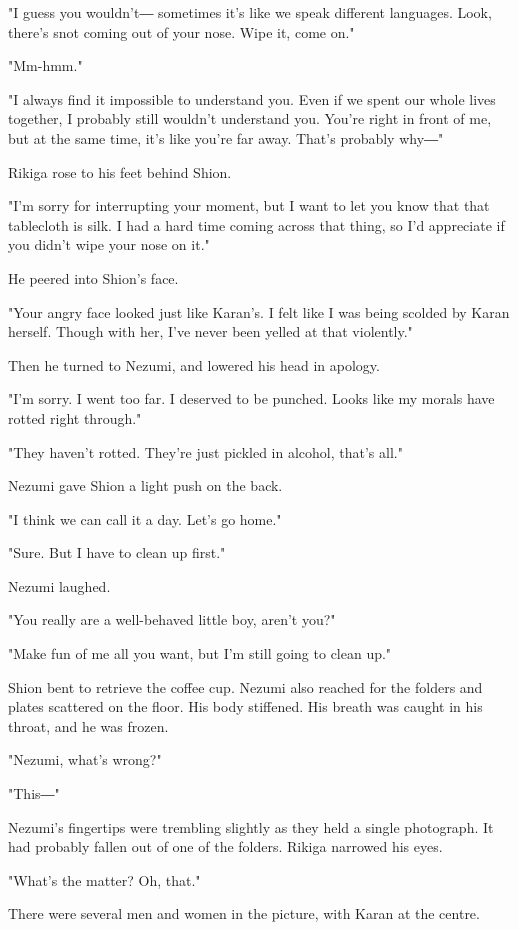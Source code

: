 "I guess you wouldn't― sometimes it's like we speak different languages.
Look, there's snot coming out of your nose. Wipe it, come on."

"Mm-hmm."

"I always find it impossible to understand you. Even if we spent our
whole lives together, I probably still wouldn't understand you. You're
right in front of me, but at the same time, it's like you're far away.
That's probably why―"

Rikiga rose to his feet behind Shion.

"I'm sorry for interrupting your moment, but I want to let you know that
that tablecloth is silk. I had a hard time coming across that thing, so
I'd appreciate if you didn't wipe your nose on it."

He peered into Shion's face.

"Your angry face looked just like Karan's. I felt like I was being
scolded by Karan herself. Though with her, I've never been yelled at
that violently."

Then he turned to Nezumi, and lowered his head in apology.

"I'm sorry. I went too far. I deserved to be punched. Looks like my
morals have rotted right through."

"They haven't rotted. They're just pickled in alcohol, that's all."

Nezumi gave Shion a light push on the back.

"I think we can call it a day. Let's go home."

"Sure. But I have to clean up first."

Nezumi laughed.

"You really are a well-behaved little boy, aren't you?"

"Make fun of me all you want, but I'm still going to clean up."

Shion bent to retrieve the coffee cup. Nezumi also reached for the
folders and plates scattered on the floor. His body stiffened. His
breath was caught in his throat, and he was frozen.

"Nezumi, what's wrong?"

"This―"

Nezumi's fingertips were trembling slightly as they held a single
photograph. It had probably fallen out of one of the folders. Rikiga
narrowed his eyes.

"What's the matter? Oh, that."

There were several men and women in the picture, with Karan at the
centre.

